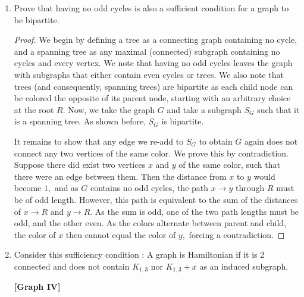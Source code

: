\documentclass[11pt]{article}
\theoremstyle{solstyle}
\newcommand{\glabel}[1]{\begin{center}\textbf{[Graph #1]}\end{center}}
\begin{document}
\begin{enumerate}[leftmargin=*]
\begin{proof}
We have reached a contradiction. Therefore, for a graph to be bipartite, it must have no odd cycles. 
\end{proof}

\item Prove that having no odd cycles is also a sufficient condition for a graph to be bipartite. 

\begin{proof}
    We begin by defining a tree as a connecting graph containing no cycle, and a spanning tree as any maximal (connected) subgraph containing no cycles and every vertex. We note that having no odd cycles leaves the graph with subgraphs that either contain even cycles or trees. We also note that trees (and consequently, spanning trees) are bipartite as each child node can be colored the opposite of its parent node, starting with an arbitrary choice at the root $R$. Now, we take the graph $G$ and take a subgraph $S_G$ such that it is a spanning tree. As shown before, $S_G$ is bipartite.  
    
    It remains to show that any edge we re-add to $S_G$ to obtain $G$ again does not connect any two vertices of the same color. We prove this by contradiction. Suppose there did exist two vertices $x$ and $y$ of the same color, such that there were an edge between them. Then the distance from $x$ to $y$ would become $1,$ and as $G$ contains no odd cycles, the path $x\rightarrow y$ through $R$ must be of odd length. However, this path is equivalent to the sum of the distances of $x\rightarrow R$ and $y\rightarrow R.$ As the sum is odd, one of the two path lengths must be odd, and the other even. As the colors alternate between parent and child, the color of $x$ then cannot equal the color of $y,$ forcing a contradiction.
\end{proof}

\item Consider this sufficiency condition : A graph is Hamiltonian if it is 2 connected and does not contain $K_{1,3}$ nor $K_{1, 3} + x$ as an induced subgraph. 

\begin{center}
\qquad
{}
\end{center}
\glabel{IV}


\end{enumerate}
\end{document}
